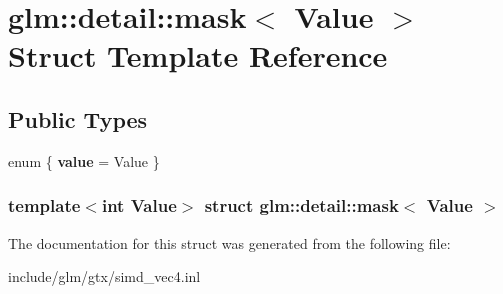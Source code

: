 \hypertarget{structglm_1_1detail_1_1mask}{\section{glm\-:\-:detail\-:\-:mask$<$ \-Value $>$ \-Struct \-Template \-Reference}
\label{structglm_1_1detail_1_1mask}
}
\subsection*{\-Public \-Types}
\begin{DoxyCompactItemize}
\item 
enum \{ {\bfseries value} =  \-Value
 \}
\end{DoxyCompactItemize}
\subsubsection*{template$<$int \-Value$>$ struct glm\-::detail\-::mask$<$ Value $>$}



\-The documentation for this struct was generated from the following file\-:\begin{DoxyCompactItemize}
\item 
include/glm/gtx/simd\-\_\-vec4.\-inl\end{DoxyCompactItemize}
